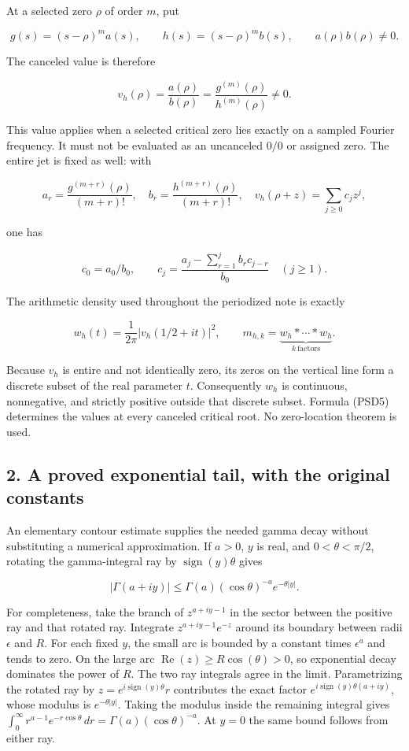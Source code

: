 At a selected zero \(\rho\) of order \(m\), put

\[
g(s)=(s-\rho)^m a(s),\qquad h(s)=(s-\rho)^m b(s),
\qquad a(\rho)b(\rho)\ne0.
\]

The canceled value is therefore

\[
v_h(\rho)=\frac{a(\rho)}{b(\rho)}
=\frac{g^{(m)}(\rho)}{h^{(m)}(\rho)}\ne0.
\tag{PSD5}
\]

This value applies when a selected critical zero lies exactly on a sampled Fourier frequency. It must not be evaluated as an uncanceled \(0/0\) or assigned zero. The entire jet is fixed as well: with

\[
a_r=\frac{g^{(m+r)}(\rho)}{(m+r)!},\quad
b_r=\frac{h^{(m+r)}(\rho)}{(m+r)!},\quad
v_h(\rho+z)=\sum_{j\ge0}c_jz^j,
\]

one has

\[
c_0=a_0/b_0,\qquad
c_j=\frac{a_j-\sum_{r=1}^j b_r c_{j-r}}{b_0}\quad(j\ge1).
\tag{PSD6}
\]

The arithmetic density used throughout the periodized note is exactly

\[
w_h(t)=\frac1{2\pi}\left|v_h(1/2+it)\right|^2,
\qquad m_{h,k}=\underbrace{w_h*\cdots*w_h}_{k\ \mathrm{factors}}.
\tag{PSD7}
\]

Because \(v_h\) is entire and not identically zero, its zeros on the vertical line form a discrete subset of the real parameter \(t\). Consequently \(w_h\) is continuous, nonnegative, and strictly positive outside that discrete subset. Formula (PSD5) determines the values at every canceled critical root. No zero-location theorem is used.

\subsection{2. A proved exponential tail, with the original constants}\label{a-proved-exponential-tail-with-the-original-constants}

An elementary contour estimate supplies the needed gamma decay without substituting a numerical approximation. If \(a>0\), \(y\) is real, and \(0<\theta<\pi/2\), rotating the gamma-integral ray by \(\operatorname{sign}(y) \theta\) gives

\[
|\Gamma(a+iy)|
\le \Gamma(a)(\cos\theta)^{-a}e^{-\theta|y|}.
\tag{PSD8}
\]

For completeness, take the branch of \(z^{a+iy-1}\) in the sector between the positive ray and that rotated ray. Integrate \(z^{a+iy-1}e^{-z}\) around its boundary between radii \(\epsilon\) and \(R\). For each fixed \(y\), the small arc is bounded by a constant times \(\epsilon^a\) and tends to zero. On the large arc \(\operatorname{Re}(z)\ge R \cos(\theta)>0\), so exponential decay dominates the power of \(R\). The two ray integrals agree in the limit. Parametrizing the rotated ray by \(z=e^{i \operatorname{sign}(y) \theta}r\) contributes the exact factor \(e^{i \operatorname{sign}(y) \theta(a+iy)}\), whose modulus is \(e^{-\theta|y|}\). Taking the modulus inside the remaining integral gives \(\int_0^\infty r^{a-1}e^{-r\cos\theta}\,dr=\Gamma(a)(\cos\theta)^{-a}\). At \(y=0\) the same bound follows from either ray.

